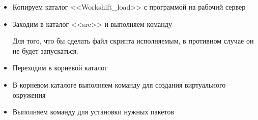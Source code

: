 \begin{itemize}
	\item Копируем каталог <<Workshift\_load>> с программой на рабочий сервер
	\item  Заходим в каталог <<src>> и выполняем команду
	
%		

	
	Для того, что бы сделать файл скрипта исполняемым, в противном случае он не будет запускаться.  

	\item Переходим в корневой каталог
	
 
	\item В корневом каталоге выполняем команду для создания виртуального окружения
	
%	

   
	\item  Выполняем команду для установки нужных пакетов
	
%	
    
    
    
	
	
\end{itemize}
